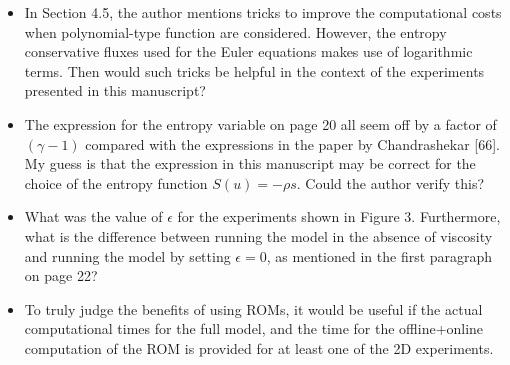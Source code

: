 \documentclass{article}
\newcommand{\bnote}[1]{{\color{blue}{#1}}}
\begin{document}
\begin{itemize}
\item In Section 4.5, the author mentions tricks to improve the computational costs when polynomial-type function are considered. However, the entropy conservative fluxes used for the Euler equations makes use of logarithmic terms. Then would such tricks be helpful in the context of the experiments presented in this manuscript?

\bnote{They unfortunately would not be helpful for the experiments in this work, at least not without giving up discrete entropy conservation (dissipation).  We have added a footnote explaining this:
\\
\\
``Because entropy conservative fluxes for the compressible Euler equations include non-polynomial rational and logarithmic terms, it is not possible to apply this exact treatment of polynomial nonlinearities to general entropy conservative discretizations.''}

\item The expression for the entropy variable on page 20 all seem off by a factor of $(\gamma -1)$ compared with the expressions in the paper by Chandrashekar [66]. My guess is that the expression in this manuscript may be correct for the choice of the entropy function $S(u) = -\rho s$. Could the author verify this?

\bnote{We thank the reviewer for catching this.  We have corrected the entropy function in the revised manuscript.}

\item What was the value of $\epsilon$ for the experiments shown in Figure 3. Furthermore, what is the difference between running the model in the absence of viscosity and running the model by setting $\epsilon = 0$, as mentioned in the first paragraph on page 22?

\bnote{We have added $\epsilon = 2e-4$ to the description.  We have also removed the sentence with $\epsilon = 0$, which the reviewer has correctly pointed out is redundant.}

\item To truly judge the benefits of using ROMs, it would be useful if the actual computational times for the full model, and the time for the offline+online computation of the ROM is provided for at least one of the 2D experiments. 


\end{itemize}
\end{document}
